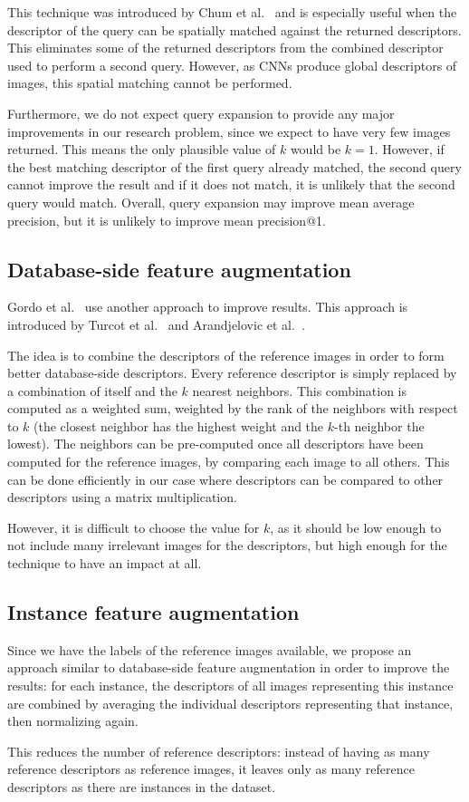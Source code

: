 This technique was introduced by
Chum et al.~\cite{chum_total_2007} and is especially useful
when the descriptor of the query can be spatially matched
against the returned descriptors. This eliminates some of the
returned descriptors from the combined descriptor used
to perform a second query. However, as CNNs produce
global descriptors of images, this spatial matching cannot
be performed.

Furthermore, we do not expect query expansion to provide
any major improvements in our research problem, since
we expect to have very few images returned. This means
the only plausible value of $k$ would be $k=1$. However,
if the best matching descriptor of the first query already
matched, the second query cannot improve the result
and if it does not match, it is unlikely that the second
query would match. Overall, query expansion may
improve mean average precision, but it is unlikely to
improve mean precision@1.

\subsection{Database-side feature augmentation}
Gordo et al.~\cite{gordo_end--end_2016} use another
approach to improve results. This approach is introduced
by Turcot et al.~\cite{turcot_better_2009} and
Arandjelovic et al.~\cite{arandjelovic_three_2012}.

The idea is to combine the descriptors of the reference
images in order to form better database-side descriptors.
Every reference descriptor is simply replaced by a
combination of itself and the $k$ nearest neighbors.
This combination is computed as a weighted sum, weighted
by the rank of the neighbors with respect to $k$ (the
closest neighbor has the highest weight and the $k$-th
neighbor the lowest).
The neighbors can be pre-computed once all descriptors
have been computed for the reference images, by comparing
each image to all others. This can be done efficiently
in our case where descriptors can be compared to other
descriptors using a matrix multiplication.

However, it is difficult to choose the value for $k$, as
it should be low enough to not include many irrelevant
images for the descriptors, but high enough for the
technique to have an impact at all.

\subsection{Instance feature augmentation}\label{sec:ifa}
Since we have the labels of the reference images
available, we propose an approach similar to
database-side feature augmentation in order to
improve the results: for each instance, the descriptors
of all images representing this instance are combined
by averaging the individual descriptors representing
that instance, then normalizing again.

This reduces the number of reference descriptors:
instead of having as many reference descriptors as
reference images, it leaves only as many reference
descriptors as there are instances in the dataset.
